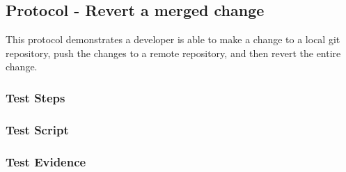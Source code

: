 \newpage
\subsection{Protocol - Revert a merged change}
This protocol demonstrates a developer is able to make a change to a local
git repository, push the changes to a remote repository, and then
revert the entire change.

\subsubsection{Test Steps}
      {}
      {}

\newpage
\subsubsection{Test Script}


\newpage
\subsubsection{Test Evidence}
      {}
      {}
